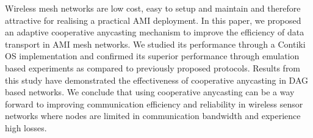 \documentclass[conference]{IEEEtran}
\begin{document}
Wireless mesh networks are low cost, easy to setup and maintain and therefore attractive for realising a practical AMI deployment. In this paper, we proposed an adaptive cooperative anycasting mechanism to improve the efficiency of data transport in AMI mesh networks. We studied its performance through  a Contiki OS implementation and confirmed its superior performance through emulation based experiments as compared to previously proposed protocols. Results from this study have demonstrated the effectiveness of cooperative anycasting in DAG based networks. We conclude that using cooperative anycasting can be a way forward to improving communication efficiency and reliability in wireless sensor networks where nodes are limited in communication bandwidth and experience high losses.






















\ifCLASSOPTIONcaptionsoff
  \newpage
\fi
\end{document}
